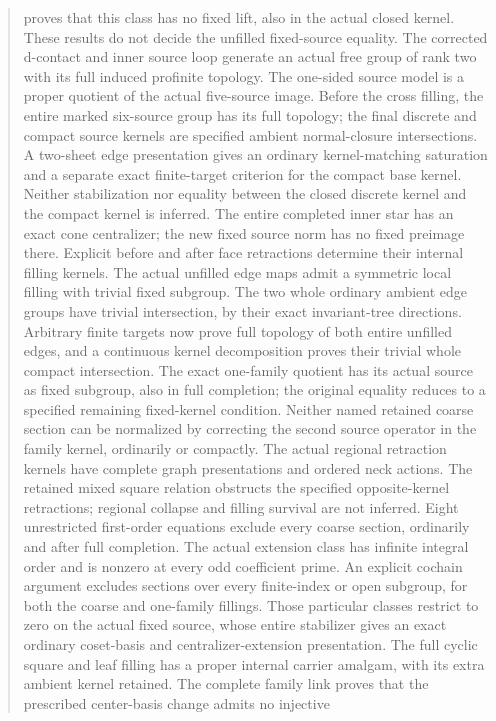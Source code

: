 \documentclass[11pt,a4paper]{article}
\begin{document}
\begin{abstract}
proves that this class has no fixed lift, also in the actual closed
kernel. These results do not decide the unfilled fixed-source equality.
The corrected d-contact and inner source loop generate an actual free
group of rank two with its full induced profinite topology. The one-sided
source model is a proper quotient of the actual five-source image.
Before the cross filling, the entire marked six-source group has its
full topology; the final discrete and compact source kernels are specified
ambient normal-closure intersections. A two-sheet edge presentation gives
an ordinary kernel-matching saturation and a separate exact finite-target
criterion for the compact base kernel. Neither stabilization nor equality
between the closed discrete kernel and the compact kernel is inferred.
The entire completed inner star has an exact cone centralizer;
the new fixed source norm has no fixed preimage there. Explicit before
and after face retractions determine their internal filling kernels.
The actual unfilled edge maps admit a symmetric local filling with
trivial fixed subgroup. The two whole ordinary ambient edge groups have
trivial intersection, by their exact invariant-tree directions.
Arbitrary finite targets now prove full topology of both entire
unfilled edges, and a continuous kernel decomposition proves their
trivial whole compact intersection. The exact one-family quotient has
its actual source as fixed subgroup, also in full completion; the
original equality reduces to a specified remaining fixed-kernel
condition. Neither named retained coarse section can be normalized by
correcting the second source operator in the family kernel, ordinarily
or compactly. The actual regional retraction kernels have complete
graph presentations and ordered neck actions. The retained mixed square
relation obstructs the specified opposite-kernel retractions; regional
collapse and filling survival are not inferred. Eight unrestricted first-order
equations exclude every coarse section, ordinarily and after full
completion. The actual extension class has infinite integral order and
is nonzero at every odd coefficient prime. An explicit cochain argument
excludes sections over every finite-index or open subgroup, for both
the coarse and one-family fillings. Those particular classes restrict
to zero on the actual fixed source, whose entire stabilizer gives an
exact ordinary coset-basis and centralizer-extension presentation.
The full cyclic square and leaf filling has a proper internal carrier
amalgam, with its extra ambient kernel retained. The complete family
link proves that the prescribed center-basis change admits no injective

\end{abstract}
\end{document}
